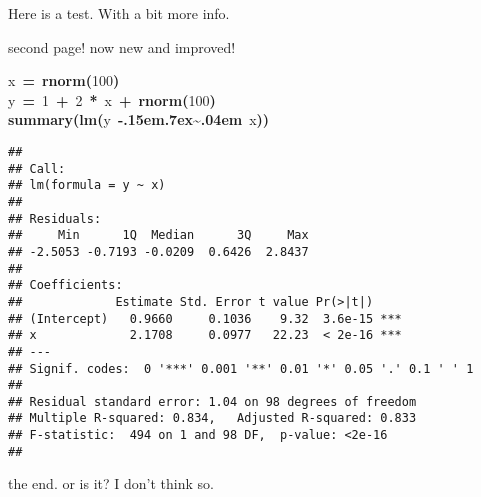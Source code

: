 \documentclass{article}
\makeatletter
\newcommand{\hlnumber}[1]{\textcolor[rgb]{0,0,0}{#1}}%
\newcommand{\hlfunctioncall}[1]{\textcolor[rgb]{0.501960784313725,0,0.329411764705882}{\textbf{#1}}}%
\newcommand{\hlkeyword}[1]{\textcolor[rgb]{0,0,0}{\textbf{#1}}}%
\newcommand{\hlassignement}[1]{\textcolor[rgb]{0,0,0}{\textbf{#1}}}%
\newcommand{\hlsymbol}[1]{\textcolor[rgb]{0,0,0}{#1}}%
\def\urltilda{\kern -.15em\lower .7ex\hbox{\~{}}\kern .04em}%
\newcommand{\hlstd}[1]{\textcolor[rgb]{0,0,0}{#1}}%
\newenvironment{kframe}{%
 \def\FrameCommand##1{\hskip\@totalleftmargin \hskip-\fboxsep
 \colorbox{shadecolor}{##1}\hskip-\fboxsep
     \hskip-\linewidth \hskip-\@totalleftmargin \hskip\columnwidth}%
 \MakeFramed {\advance\hsize-\width
   \@totalleftmargin\z@ \linewidth\hsize
   \@setminipage}}%
 {\par\unskip\endMakeFramed}
\newenvironment{knitrout}{}{} %
\makeatother
\begin{document}
Here is a test. With a bit more info.

\newpage second page! now new and improved!

\begin{knitrout}
\color{fgcolor}\begin{kframe}
\begin{flushleft}
\ttfamily\noindent
\hlsymbol{x}{\ }\hlassignement{=}{\ }\hlfunctioncall{rnorm}\hlkeyword{(}\hlnumber{100}\hlkeyword{)}\hspace*{\fill}\\
\hlstd{}\hlsymbol{y}{\ }\hlassignement{=}{\ }\hlnumber{1}{\ }\hlkeyword{+}{\ }\hlnumber{2}{\ }\hlkeyword{*}{\ }\hlsymbol{x}{\ }\hlkeyword{+}{\ }\hlfunctioncall{rnorm}\hlkeyword{(}\hlnumber{100}\hlkeyword{)}\hspace*{\fill}\\
\hlstd{}\hlfunctioncall{summary}\hlkeyword{(}\hlfunctioncall{lm}\hlkeyword{(}\hlsymbol{y}{\ }\hlkeyword{\urltilda{}}{\ }\hlsymbol{x}\hlkeyword{)}\hlkeyword{)}\mbox{}
\normalfont
\end{flushleft}
\begin{verbatim}
## 
## Call:
## lm(formula = y ~ x)
## 
## Residuals:
##     Min      1Q  Median      3Q     Max 
## -2.5053 -0.7193 -0.0209  0.6426  2.8437 
## 
## Coefficients:
##             Estimate Std. Error t value Pr(>|t|)    
## (Intercept)   0.9660     0.1036    9.32  3.6e-15 ***
## x             2.1708     0.0977   22.23  < 2e-16 ***
## ---
## Signif. codes:  0 '***' 0.001 '**' 0.01 '*' 0.05 '.' 0.1 ' ' 1 
## 
## Residual standard error: 1.04 on 98 degrees of freedom
## Multiple R-squared: 0.834,	Adjusted R-squared: 0.833 
## F-statistic:  494 on 1 and 98 DF,  p-value: <2e-16 
## 
\end{verbatim}
\end{kframe}
\end{knitrout}


the end. or is it? I don't think so.
\end{document}
